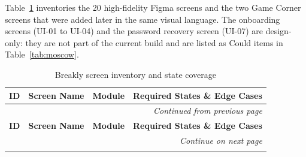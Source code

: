 Table~\ref{tab:screen-inventory} inventories the 20 high-fidelity Figma screens and the two Game Corner screens that were added later in the same visual language. The onboarding screens (UI-01 to UI-04) and the password recovery screen (UI-07) are design-only: they are not part of the current build and are listed as Could items in Table~\ref{tab:moscow}.

\begin{longtable}{|p{1.2cm}|p{3.2cm}|p{3.8cm}|p{6.4cm}|}
\caption{Breakly screen inventory and state coverage}
\label{tab:screen-inventory}\\
\hline
\textbf{ID} & \textbf{Screen Name} & \textbf{Module} & \textbf{Required States \& Edge Cases} \\
\hline
\endfirsthead
\multicolumn{4}{r}{\textit{Continued from previous page}}\\[-2pt]\hline
\textbf{ID} & \textbf{Screen Name} & \textbf{Module} & \textbf{Required States \& Edge Cases} \\
\hline
\endhead
\multicolumn{4}{r}{\textit{Continue on next page}}\\
\endfoot
\endlastfoot


\end{longtable}
